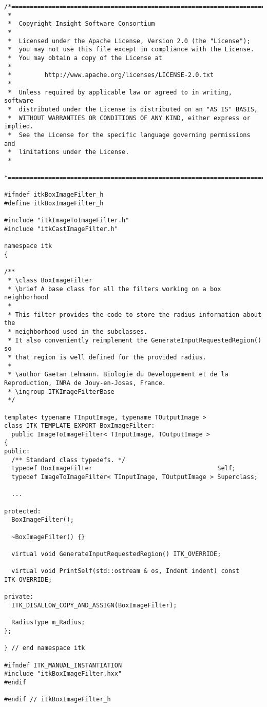 \small
\begin{verbatim}
/*=========================================================================
 *
 *  Copyright Insight Software Consortium
 *
 *  Licensed under the Apache License, Version 2.0 (the "License");
 *  you may not use this file except in compliance with the License.
 *  You may obtain a copy of the License at
 *
 *         http://www.apache.org/licenses/LICENSE-2.0.txt
 *
 *  Unless required by applicable law or agreed to in writing, software
 *  distributed under the License is distributed on an "AS IS" BASIS,
 *  WITHOUT WARRANTIES OR CONDITIONS OF ANY KIND, either express or implied.
 *  See the License for the specific language governing permissions and
 *  limitations under the License.
 *
 *=========================================================================*/

#ifndef itkBoxImageFilter_h
#define itkBoxImageFilter_h

#include "itkImageToImageFilter.h"
#include "itkCastImageFilter.h"

namespace itk
{

/**
 * \class BoxImageFilter
 * \brief A base class for all the filters working on a box neighborhood
 *
 * This filter provides the code to store the radius information about the
 * neighborhood used in the subclasses.
 * It also conveniently reimplement the GenerateInputRequestedRegion() so
 * that region is well defined for the provided radius.
 *
 * \author Gaetan Lehmann. Biologie du Developpement et de la Reproduction, INRA de Jouy-en-Josas, France.
 * \ingroup ITKImageFilterBase
 */

template< typename TInputImage, typename TOutputImage >
class ITK_TEMPLATE_EXPORT BoxImageFilter:
  public ImageToImageFilter< TInputImage, TOutputImage >
{
public:
  /** Standard class typedefs. */
  typedef BoxImageFilter                                  Self;
  typedef ImageToImageFilter< TInputImage, TOutputImage > Superclass;

  ...

protected:
  BoxImageFilter();

  ~BoxImageFilter() {}

  virtual void GenerateInputRequestedRegion() ITK_OVERRIDE;

  virtual void PrintSelf(std::ostream & os, Indent indent) const ITK_OVERRIDE;

private:
  ITK_DISALLOW_COPY_AND_ASSIGN(BoxImageFilter);

  RadiusType m_Radius;
};

} // end namespace itk

#ifndef ITK_MANUAL_INSTANTIATION
#include "itkBoxImageFilter.hxx"
#endif

#endif // itkBoxImageFilter_h
\end{verbatim}
\normalsize


